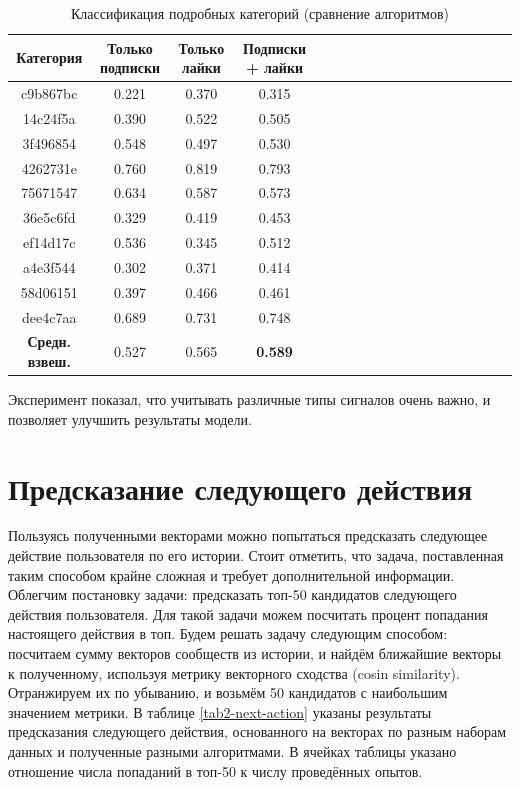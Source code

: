 \documentclass[times,specification,annotation]{itmo-student-thesis}
\begin{document}
\begin{table}[!h]
\caption{Классификация подробных категорий (сравнение алгоритмов)}\label{tab-all-d}
\centering
\begin{tabular}{|*{18}{c|}}\hline
Категория & Только подписки  & Только лайки & Подписки + лайки \\\hline
c9b867bc          & 0.221 & 0.370 & 0.315  \\\hline
14c24f5a           & 0.390 & 0.522 & 0.505  \\\hline
3f496854           & 0.548 & 0.497 & 0.530 \\\hline
4262731e          & 0.760 & 0.819 & 0.793   \\\hline
75671547          & 0.634 & 0.587 & 0.573  \\\hline
36e5c6fd           & 0.329 & 0.419 & 0.453 \\\hline
ef14d17c           & 0.536 & 0.345 & 0.512 \\\hline
a4e3f544           & 0.302 & 0.371 & 0.414 \\\hline
58d06151          & 0.397 & 0.466 & 0.461 \\\hline
dee4c7aa          & 0.689 & 0.731 & 0.748 \\\hline
\textbf{Средн. взвеш.}  & 0.527 & 0.565 & \textbf{0.589}  \\\hline
\end{tabular}
\end{table}

Эксперимент показал, что учитывать различные типы сигналов очень важно, и позволяет улучшить результаты модели.  


\section{Предсказание следующего действия}\label{sec:next-action}
Пользуясь полученными векторами можно попытаться предсказать следующее действие пользователя по его истории. Стоит отметить, что задача, поставленная таким способом крайне сложная и требует дополнительной информации.
Облегчим постановку задачи: предсказать топ-50 кандидатов следующего действия пользователя. Для такой задачи можем посчитать процент попадания настоящего действия в топ. Будем решать задачу следующим способом: посчитаем сумму векторов сообществ из истории, и найдём ближайшие векторы к полученному, используя метрику векторного сходства (cosin similarity). Отранжируем их по убыванию, и возьмём 50 кандидатов с наибольшим значением метрики.
В таблице \ref {tab2-next-action} указаны результаты предсказания следующего действия, основанного на векторах по разным наборам данных и полученные разными алгоритмами. В ячейках таблицы указано отношение числа попаданий в топ-50 к числу проведённых опытов.  
\end{document}
